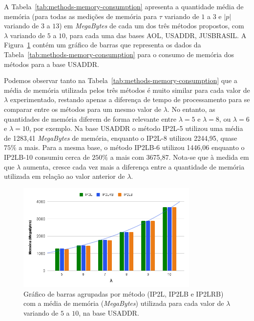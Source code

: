 A Tabela~\ref{tab:methods-memory-consumption} apresenta a quantidade média de memória (para todas as medições de memória para $\tau$ variando de $1$ a $3$ e $|p|$ variando de $3$ a $13$) em \textit{MegaBytes} de cada um dos três métodos propostos, com $\lambda$ variando de $5$ a $10$, para cada uma das bases AOL, USADDR, JUSBRASIL. A Figura~\ref{fig:memory_consumption_usaddr} contém um gráfico de barras que representa os dados da Tabela~\ref{tab:methods-memory-consumption} para o consumo de memória dos métodos para a base USADDR.

Podemos observar tanto na Tabela~\ref{tab:methods-memory-consumption} que a média de memória utilizada pelos três métodos é muito similar para cada valor de $\lambda$ experimentado, restando apenas a diferença de tempo de processamento para se comparar entre os métodos para um mesmo valor de $\lambda$. No entanto, as quantidades de memória diferem de forma relevante entre $\lambda=5$ e $\lambda=8$, ou $\lambda=6$ e $\lambda=10$, por exemplo. Na base USADDR o método IP2L-5 utilizou uma média de 1283,41 \textit{MegaBytes} de memória, enquanto o IP2L-8 utilizou 2244,95, quase $75\%$ a mais. Para a mesma base, o método IP2LB-6 utilizou 1446,06 enquanto o IP2LB-10 consumiu cerca de $250\%$ a mais com 3675,87. Nota-se que à medida em que $\lambda$ aumenta, cresce cada vez mais a diferença entre a quantidade de memória utilizada em relação ao valor anterior de $\lambda$. 

\begin{figure} [h]
    \centering
    \includegraphics[width=0.80\textwidth]{figures/memory_usaddr.png}
    \caption{Gráfico de barras agrupadas por método (IP2L, IP2LB e IP2LRB) com a média de memória (\textit{MegaBytes}) utilizada para cada valor de $\lambda$ variando de $5$ a $10$, na base USADDR.}
    \label{fig:memory_consumption_usaddr}
\end{figure}

